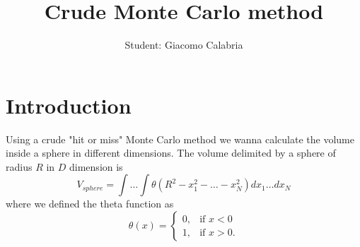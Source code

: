 \documentclass{article}
\title{\textbf{Crude Monte Carlo method}}
\author{Student: Giacomo Calabria}
\date{}
\begin{document}
\maketitle

\section*{Introduction}
Using a crude "hit or miss" Monte Carlo method we wanna calculate the volume inside a sphere in different dimensions. The volume delimited by a sphere of radius $R$ in $D$ dimension is
\begin{equation}
    V_{sphere}=\int\dots\int{\theta(R^2-x_1^2-\dots-x_N^2)dx_1\dots dx_N}
\end{equation}
where we defined the theta function as
\begin{equation}
    \theta(x)=\begin{cases}
        0,&\text{if } x<0\\
        1,&\text{if } x>0.
    \end{cases}
\end{equation}
\end{document}
